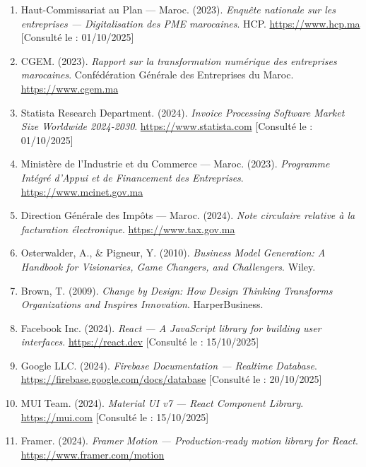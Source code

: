 \documentclass[12pt,a4paper]{report}
\begin{document}
\begin{enumerate}

\item Haut-Commissariat au Plan — Maroc. (2023). \textit{Enquête nationale sur les entreprises — Digitalisation des PME marocaines}. HCP. \url{https://www.hcp.ma} [Consulté le : 01/10/2025]

\item CGEM. (2023). \textit{Rapport sur la transformation numérique des entreprises marocaines}. Confédération Générale des Entreprises du Maroc. \url{https://www.cgem.ma}

\item Statista Research Department. (2024). \textit{Invoice Processing Software Market Size Worldwide 2024-2030}. \url{https://www.statista.com} [Consulté le : 01/10/2025]

\item Ministère de l'Industrie et du Commerce — Maroc. (2023). \textit{Programme Intégré d'Appui et de Financement des Entreprises}. \url{https://www.mcinet.gov.ma}

\item Direction Générale des Impôts — Maroc. (2024). \textit{Note circulaire relative à la facturation électronique}. \url{https://www.tax.gov.ma}

\item Osterwalder, A., \& Pigneur, Y. (2010). \textit{Business Model Generation: A Handbook for Visionaries, Game Changers, and Challengers}. Wiley.

\item Brown, T. (2009). \textit{Change by Design: How Design Thinking Transforms Organizations and Inspires Innovation}. HarperBusiness.

\item Facebook Inc. (2024). \textit{React — A JavaScript library for building user interfaces}. \url{https://react.dev} [Consulté le : 15/10/2025]

\item Google LLC. (2024). \textit{Firebase Documentation — Realtime Database}. \url{https://firebase.google.com/docs/database} [Consulté le : 20/10/2025]

\item MUI Team. (2024). \textit{Material UI v7 — React Component Library}. \url{https://mui.com} [Consulté le : 15/10/2025]

\item Framer. (2024). \textit{Framer Motion — Production-ready motion library for React}. \url{https://www.framer.com/motion}


\end{enumerate}
\end{document}
